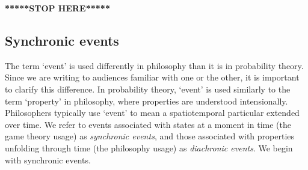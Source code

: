 \documentclass[
11pt,
titlepage,
reqno,
]{article}%
\theoremstyle{definition}
\begin{document}
	
	\textbf{*****STOP HERE*****}
	
	
	\subsection{Synchronic events}
	
	The term `event' is used differently in philosophy than it is in probability theory. 
	Since we are writing to audiences familiar with one or the other, it is important to clarify this difference. 
	In probability theory, `event' is used similarly to the term `property' in philosophy, where properties are understood intensionally. 
	Philosophers typically use `event' to mean a spatiotemporal particular extended over time. 
	We refer to events associated with states at a moment in time (the game theory usage) as \textit{synchronic events}, and those associated with properties unfolding through time (the philosophy usage) as \textit{diachronic events}.
	We begin with synchronic events.
	
\end{document}
